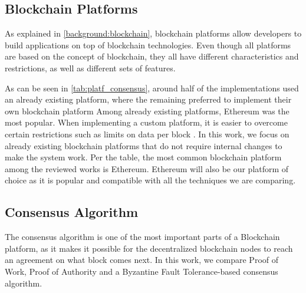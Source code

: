 \subsection{Blockchain Platforms}\label{background:blockchain_platforms}
 
As explained in \autoref{background:blockchain}, blockchain platforms allow developers to build applications on top of blockchain technologies. Even though all platforms are based on the concept of blockchain, they all have different characteristics and restrictions, as well as different sets of features.

As can be seen in \autoref{tab:platf_consensus}, around half of the implementations used an already existing platform, where the remaining preferred to implement their own blockchain platform Among already existing platforms, Ethereum was the most popular. When implementing a custom platform, it is easier to overcome certain restrictions such as limits on data per block \cite{8733825, 9524833}. In this work, we focus on already existing blockchain platforms that do not require internal changes to make the system work. Per the table, the most common blockchain platform among the reviewed works is Ethereum. Ethereum will also be our platform of choice as it is popular and compatible with all the techniques we are comparing.

\subsection{Consensus Algorithm}\label{background:consensus_algorithms}

The consensus algorithm is one of the most important parts of a Blockchain platform, as it makes it possible for the decentralized blockchain nodes to reach an agreement on what block comes next. In this work, we compare Proof of Work, Proof of Authority and a Byzantine Fault Tolerance-based consensus algorithm.

